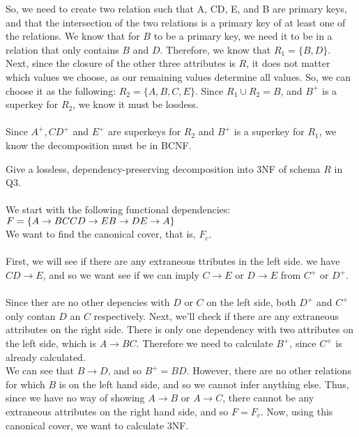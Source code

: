 \documentclass[a4 paper]{article}
\begin{document}
So, we need to create two relation such that A, CD, E, and B are primary keys, and that the intersection of the two relations is a primary key of at least one of the relations. We know that for $B$ to be a primary key, we need it to be in a relation that only contains $B$ and $D$. Therefore, we know that $R_1=\{B,D\}$. Next, since the closure of the other three attributes is $R$, it does not matter which values we choose, as our remaining values determine all values. So, we can choose it as the following: $R_2=\{A,B,C,E\}$. Since $R_1\cup R_2={B}$, and $B^+$ is a superkey for $R_2$, we know it must be lossless.\\\\
Since $A^+, CD^+$ and $E^+$ are superkeys for $R_2$ and $B^+$ is a superkey for $R_1$, we know the decomposition must be in BCNF.






Give a lossless, dependency-preserving decomposition into 3NF of schema $R$ in Q3.\\\\

We start with the following functional dependencies:
\\$F = \{
\\A \rightarrow BC\\
CD \rightarrow E\\
B \rightarrow D\\
E \rightarrow A\}$\\
We want to find the canonical cover, that is, $F_c$.\\\\
First, we will see if there are any extraneous ttributes in the left side. we have $CD\rightarrow E$, and so we want see if we can imply $C\rightarrow E$ or $D\rightarrow E$ from $C^+$ or $D^+$.\\\\
Since ther are no other depencies with $D$ or $C$ on the left side, both $D^+$ and $C^+$ only contan $D$ an $C$ respectively. Next, we'll check if there  are any extraneous attributes on the right side. There is only one dependency with two attributes on the left side, which is $A\rightarrow BC$. Therefore we need to calculate $B^+$, since $C^+$ is already calculated.\\
We can see that $B\rightarrow D$, and so $B^+=BD$. However, there are no other relations for which $B$ is on the left hand side, and so we cannot infer anything else. Thus, since we have no way of showing $A\rightarrow B$ or $A\rightarrow C$, there cannot be any extraneous attributes on the right hand side, and so $F=F_c$. Now, using this canonical cover, we want to calculate 3NF.
\end{document}

